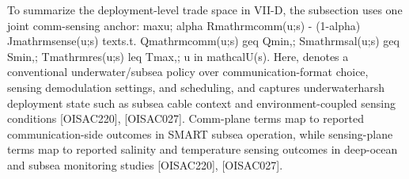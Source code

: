 {}To summarize the deployment-level trade space in VII-D, the subsection uses one joint comm-sensing anchor:\markdownRendererParagraphSeparator
{}\markdownRendererDollarSign{}\markdownRendererDollarSign{}\markdownRendererSoftLineBreak
{}\markdownRendererBackslash{}max\markdownRendererUnderscore{}\markdownRendererLeftBrace{}u\markdownRendererRightBrace{}; \markdownRendererBackslash{}alpha R\markdownRendererUnderscore{}\markdownRendererLeftBrace{}\markdownRendererBackslash{}mathrm\markdownRendererLeftBrace{}comm\markdownRendererRightBrace{}\markdownRendererRightBrace{}(u;s) - (1-\markdownRendererBackslash{}alpha) J\markdownRendererUnderscore{}\markdownRendererLeftBrace{}\markdownRendererBackslash{}mathrm\markdownRendererLeftBrace{}sense\markdownRendererRightBrace{}\markdownRendererRightBrace{}(u;s)\markdownRendererSoftLineBreak
{}\markdownRendererDollarSign{}\markdownRendererDollarSign{}\markdownRendererSoftLineBreak
{}\markdownRendererDollarSign{}\markdownRendererDollarSign{}\markdownRendererSoftLineBreak
{}\markdownRendererBackslash{}text\markdownRendererLeftBrace{}s.t. \markdownRendererRightBrace{} Q\markdownRendererUnderscore{}\markdownRendererLeftBrace{}\markdownRendererBackslash{}mathrm\markdownRendererLeftBrace{}comm\markdownRendererRightBrace{}\markdownRendererRightBrace{}(u;s) \markdownRendererBackslash{}geq Q\markdownRendererUnderscore{}\markdownRendererLeftBrace{}\markdownRendererBackslash{}min\markdownRendererRightBrace{},; S\markdownRendererUnderscore{}\markdownRendererLeftBrace{}\markdownRendererBackslash{}mathrm\markdownRendererLeftBrace{}sal\markdownRendererRightBrace{}\markdownRendererRightBrace{}(u;s) \markdownRendererBackslash{}geq S\markdownRendererUnderscore{}\markdownRendererLeftBrace{}\markdownRendererBackslash{}min\markdownRendererRightBrace{},; T\markdownRendererUnderscore{}\markdownRendererLeftBrace{}\markdownRendererBackslash{}mathrm\markdownRendererLeftBrace{}res\markdownRendererRightBrace{}\markdownRendererRightBrace{}(u;s) \markdownRendererBackslash{}leq T\markdownRendererUnderscore{}\markdownRendererLeftBrace{}\markdownRendererBackslash{}max\markdownRendererRightBrace{},; u \markdownRendererBackslash{}in \markdownRendererBackslash{}mathcal\markdownRendererLeftBrace{}U\markdownRendererRightBrace{}(s).\markdownRendererSoftLineBreak
{}\markdownRendererDollarSign{}\markdownRendererDollarSign{}\markdownRendererParagraphSeparator
{}Here,  denotes a conventional underwater/subsea policy over communication-format choice, sensing demodulation settings, and scheduling, and  captures underwater\markdownRendererUnderscore{}harsh deployment state such as subsea cable context and environment-coupled sensing conditions [O\markdownRendererUnderscore{}ISAC\markdownRendererUnderscore{}220], [O\markdownRendererUnderscore{}ISAC\markdownRendererUnderscore{}027]. Comm-plane terms map to reported communication-side outcomes in SMART subsea operation, while sensing-plane terms map to reported salinity and temperature sensing outcomes in deep-ocean and subsea monitoring studies [O\markdownRendererUnderscore{}ISAC\markdownRendererUnderscore{}220], [O\markdownRendererUnderscore{}ISAC\markdownRendererUnderscore{}027].\markdownRendererParagraphSeparator
